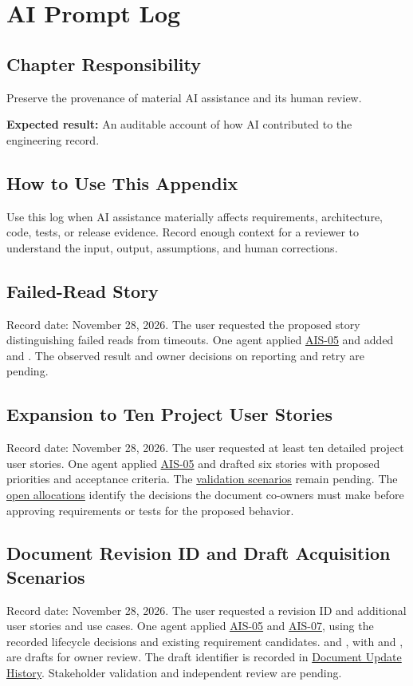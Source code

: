 \chapter{AI Prompt Log}
\section{Chapter Responsibility}
\label{Section:AIPromptLogResponsibility}
Preserve the provenance of material AI assistance and its human review.

\noindent\textbf{Expected result:} An auditable account of how AI contributed to the engineering record.

\section{How to Use This Appendix}
Use this log when AI assistance materially affects requirements, architecture, code, tests, or release evidence. Record enough context for a reviewer to understand the input, output, assumptions, and human corrections.
\section{Failed-Read Story}
Record date: November 28, 2026. The user requested the proposed story
distinguishing failed reads from timeouts. One agent applied
\hyperref[Skill:AIS-05]{AIS-05} and added  and
. The observed result and owner decisions on
reporting and retry are pending.

\section{Expansion to Ten Project User Stories}
Record date: November 28, 2026. The user requested at least ten detailed
project user stories. One agent applied \hyperref[Skill:AIS-05]{AIS-05}
and drafted six stories with proposed priorities and acceptance criteria.
The \hyperref[Table:ValidationRegister]{validation scenarios} remain pending.
The \hyperref[Section:AdditionalStoryAllocations]{open allocations} identify
the decisions the document co-owners must make before approving requirements
or tests for the proposed behavior.

\section{Document Revision ID and Draft Acquisition Scenarios}
Record date: November 28, 2026. The user requested a revision ID and
additional user stories and use cases. One agent applied
\hyperref[Skill:AIS-05]{AIS-05} and \hyperref[Skill:AIS-07]{AIS-07}, using
the recorded lifecycle decisions and existing requirement candidates.
 and , with
 and , are drafts for owner review.
The draft identifier is recorded in \hyperref[Table:DocumentHistory]{Document
Update History}. Stakeholder validation and independent review are pending.

